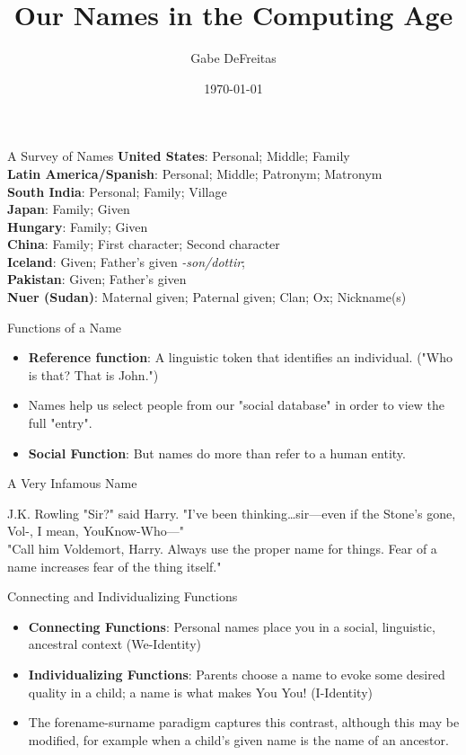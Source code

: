 \documentclass{beamer}
\title{Our Names in the Computing Age}
\date{\today}
\author{Gabe DeFreitas}
\begin{document}
\maketitle

\begin{frame}{A Survey of Names}
\textbf{United States}: Personal; Middle; Family \\
\textbf{Latin America/Spanish}: Personal; Middle; Patronym; Matronym \\
\textbf{South India}: Personal; Family; Village \parencite{finch08} \\
\textbf{Japan}: Family; Given \\
\textbf{Hungary}: Family; Given \\
\textbf{China}: Family; First character; Second character \parencite{louie06}\\
\textbf{Iceland}: Given; Father's given \textit{-son/dottir}; \\
\textbf{Pakistan}: Given; Father's given \\
\textbf{Nuer (Sudan)}: Maternal given; Paternal given; Clan; Ox; Nickname(s)
\parencite{wardhaugh92} \\
\end{frame}

\begin{frame}{Functions of a Name}
\begin{itemize}
\item \textbf{Reference function}: A linguistic token that identifies an
individual. ("Who is that? That is John.")
\item Names help us select people from our "social database" in order to view
the full "entry".
\item \textbf{Social Function}: But names do more than refer to a human entity.
\end{itemize}
\end{frame}

\begin{frame}{A Very Infamous Name}
\begin{aquote}{J.K. Rowling}
"Sir?" said Harry. "I've been thinking…sir—even if the Stone’s gone, Vol-, I
mean, YouKnow-Who—" \\ "Call him Voldemort, Harry. Always use the proper name for
things. Fear of a name increases fear of the thing itself."
\end{aquote}
\end{frame}

\begin{frame}{Connecting and Individualizing Functions}
\begin{itemize}
\item \textbf{Connecting Functions}: Personal names place you in a social,
linguistic, ancestral context (We-Identity)
\item \textbf{Individualizing Functions}: Parents choose a name to evoke some
desired quality in a child; a name is what makes You You! (I-Identity)
\item The forename-surname paradigm captures this contrast, although this may be
modified, for example when a child's given name is the name of an ancestor.
\end{itemize}
\end{frame}
\end{document}
